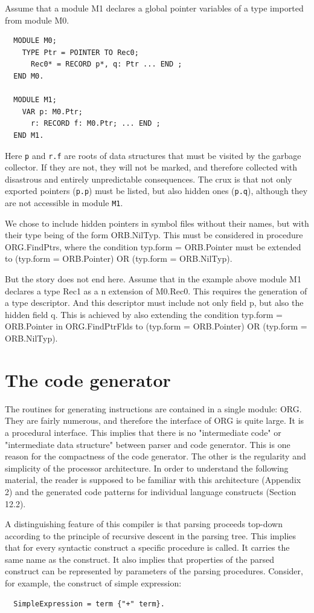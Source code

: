 Assume that a module M1 declares a global pointer variables of a type imported from module M0.
\begin{verbatim}
  MODULE M0;
    TYPE Ptr = POINTER TO Rec0;
      Rec0* = RECORD p*, q: Ptr ... END ;
  END M0.
  
  MODULE M1;
    VAR p: M0.Ptr;
      r: RECORD f: M0.Ptr; ... END ;
  END M1.
\end{verbatim}

Here \verb|p| and \verb|r.f| are roots of data structures that must be visited by the garbage
collector. If they are not, they will not be marked, and therefore collected with disastrous and
entirely unpredictable consequences. The crux is that not only exported pointers (\verb|p.p|) must be
listed, but also hidden ones (\verb|p.q|), although they are not accessible in module \verb|M1|.

We chose to include hidden pointers in symbol files without their names, but with their type being of
the form ORB.NilTyp. This must be considered in procedure ORG.FindPtrs, where the condition
typ.form = ORB.Pointer must be extended to (typ.form = ORB.Pointer) OR (typ.form = ORB.NilTyp).

But the story does not end here. Assume that in the example above module M1 declares a type
Rec1 as a n extension of M0.Rec0. This requires the generation of a type descriptor. And this
descriptor must include not only field p, but also the hidden field q. This is achieved by also
extending the condition typ.form = ORB.Pointer in ORG.FindPtrFlds to (typ.form = ORB.Pointer)
OR (typ.form = ORB.NilTyp).

\section{The code generator}
The routines for generating instructions are contained in a single module: ORG. They are fairly
numerous, and therefore the interface of ORG is quite large. It is a procedural interface. This
implies that there is no "intermediate code" or "intermediate data structure" between parser and
code generator. This is one reason for the compactness of the code generator. The other is the
regularity and simplicity of the processor architecture. In order to understand the following material,
the reader is supposed to be familiar with this architecture (Appendix 2) and the generated code
patterns for individual language constructs (Section 12.2).

A distinguishing feature of this compiler is that parsing proceeds top-down according to the principle
of recursive descent in the parsing tree. This implies that for every syntactic construct a specific
procedure is called. It carries the same name as the construct. It also implies that properties of the
parsed construct can be represented by parameters of the parsing procedures. Consider, for
example, the construct of simple expression:
\begin{verbatim}
  SimpleExpression = term {"+" term}.
\end{verbatim}

